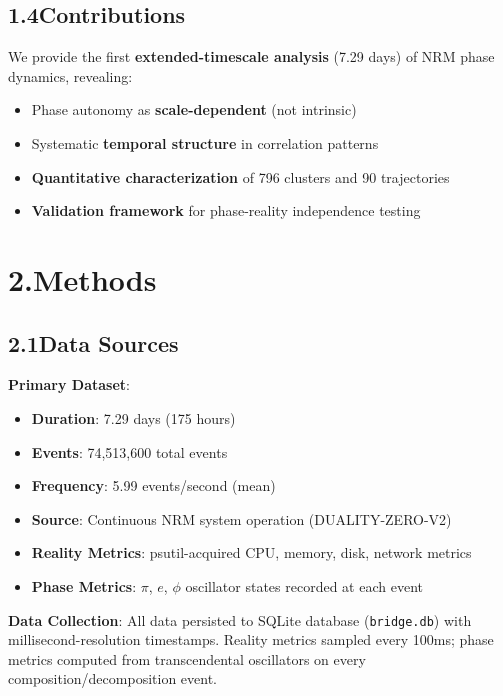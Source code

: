 \documentclass[11pt]{article}
\begin{document}
\subsection*{1.4\quad Contributions}

We provide the first \textbf{extended-timescale analysis} (7.29 days) of NRM phase dynamics, revealing:

\begin{itemize}
    \item Phase autonomy as \textbf{scale-dependent} (not intrinsic)
    \item Systematic \textbf{temporal structure} in correlation patterns
    \item \textbf{Quantitative characterization} of 796 clusters and 90 trajectories
    \item \textbf{Validation framework} for phase-reality independence testing
\end{itemize}

\section*{2.\quad Methods}

\subsection*{2.1\quad Data Sources}

\noindent\textbf{Primary Dataset}:
\begin{itemize}
    \item \textbf{Duration}: 7.29 days (175 hours)
    \item \textbf{Events}: 74,513,600 total events
    \item \textbf{Frequency}: 5.99 events/second (mean)
    \item \textbf{Source}: Continuous NRM system operation (DUALITY-ZERO-V2)
    \item \textbf{Reality Metrics}: psutil-acquired CPU, memory, disk, network metrics
    \item \textbf{Phase Metrics}: $\pi$, $e$, $\phi$ oscillator states recorded at each event
\end{itemize}

\noindent\textbf{Data Collection}: All data persisted to SQLite database (\texttt{bridge.db}) with millisecond-resolution timestamps. Reality metrics sampled every 100ms; phase metrics computed from transcendental oscillators on every composition/decomposition event.
\end{document}
